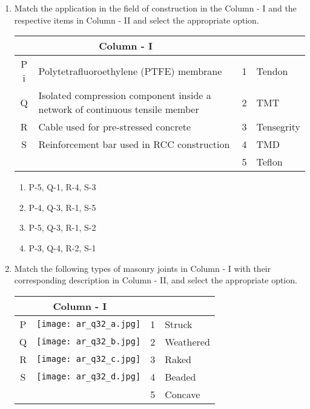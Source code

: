 \documentclass[12pt]{article}
\begin{document}
\begin{enumerate}[label=Q.\arabic*,start=26]
	\item Match the application in the field of construction in the Column - I and the respective items in Column - II and select the appropriate option.

		\begin{center}
			\begin{tabular}{|c|>{\raggedright\arraybackslash}p{5cm}|c|>{\raggedright\arraybackslash}p{6cm}|}
				\hline
				\multicolumn{2}{|c|}{\textbf{Column - I}} & \multicolumn{2}{c|}{\textbf{Column - II}} \\
				\hline
				P i& Polytetrafluoroethylene (PTFE) membrane & 1 & Tendon \\
				\hline
				Q & Isolated compression component inside a network of continuous tensile member & 2 & TMT \\
				\hline
				R & Cable used for pre-stressed concrete & 3 & Tensegrity \\
				\hline
				S & Reinforcement bar used in RCC construction & 4 & TMD \\
				\hline
				& & 5 & Teflon \\
				\hline
			\end{tabular}
		\end{center}

		\begin{multicols}{2}
			\begin{enumerate}
				\item P-5, Q-1, R-4, S-3
				\item P-4, Q-3, R-1, S-5
				\item P-5, Q-3, R-1, S-2
				\item P-3, Q-4, R-2, S-1
			\end{enumerate}
		\end{multicols}


	\item Match the following types of masonry joints in Column - I with their corresponding description in Column - II, and select the appropriate option.


		\begin{center}
			\begin{tabular}{|c|>{\raggedright\arraybackslash}p{4cm}|c|>{\raggedright\arraybackslash}p{6cm}|}
				\hline
				\multicolumn{2}{|c|}{\textbf{Column - I}} & \multicolumn{2}{c|}{\textbf{Column - II}} \\
				\hline
				P & \texttt{[image: ar\_q32\_a.jpg]} & 1 & Struck \\
				\hline
				Q &  \texttt{[image: ar\_q32\_b.jpg]} & 2 & Weathered \\
				\hline
				R &  \texttt{[image: ar\_q32\_c.jpg]} & 3 & Raked \\
				\hline
				S &  \texttt{[image: ar\_q32\_d.jpg]} & 4 & Beaded \\
				\hline
				&          & 5 & Concave \\
				\hline
			\end{tabular}
		\end{center}


\end{enumerate}
\end{document}
